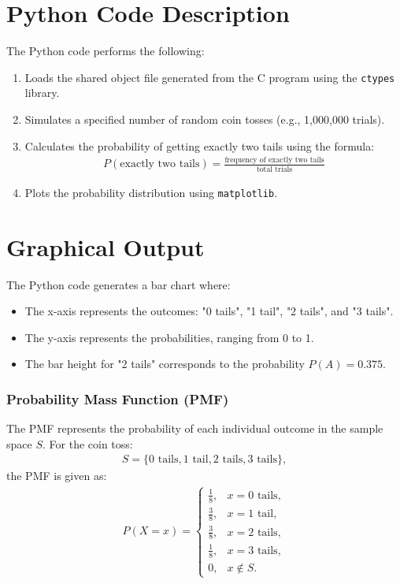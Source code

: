 \documentclass[journal]{IEEEtran}
\begin{document}
\section*{Python Code Description}
The Python code performs the following:
\begin{enumerate}
    \item Loads the shared object file generated from the C program using the \texttt{ctypes} library.
    \item Simulates a specified number of random coin tosses (e.g., 1,000,000 trials).
    \item Calculates the probability of getting exactly two tails using the formula:
    \begin{align}
    P(\text{exactly two tails}) = \frac{\text{frequency of exactly two tails}}{\text{total trials}}
    \end{align}
    \item Plots the probability distribution using \texttt{matplotlib}.
\end{enumerate}

\section*{Graphical Output}
The Python code generates a bar chart where:
\begin{itemize}
    \item The x-axis represents the outcomes: "0 tails", "1 tail", "2 tails", and "3 tails".
    \item The y-axis represents the probabilities, ranging from 0 to 1.
    \item The bar height for "2 tails" corresponds to the probability $P(A) = 0.375$.
\end{itemize}

\subsubsection*{Probability Mass Function (PMF)}
The PMF represents the probability of each individual outcome in the sample space \( S \). For the coin toss:
\begin{align}
S = \{0 \text{ tails}, 1 \text{ tail}, 2 \text{ tails}, 3 \text{ tails}\},
\end{align}
the PMF is given as:
\begin{align}
P(X = x) = 
\begin{cases} 
\frac{1}{8}, & x = 0 \text{ tails}, \\
\frac{3}{8}, & x = 1 \text{ tail}, \\
\frac{3}{8}, & x = 2 \text{ tails}, \\
\frac{1}{8}, & x = 3 \text{ tails}, \\
0, & x \notin S.
\end{cases}
\end{align}
\end{document}
